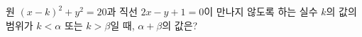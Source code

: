 원 $(x-k)^2+y^2=20$과 직선 $2x-y+1=0$이 만나지 않도록 하는 실수 $k$의 값의 범위가 $k<\alpha$ 또는 $k>\beta$일 때, $\alpha+\beta$의 값은?
